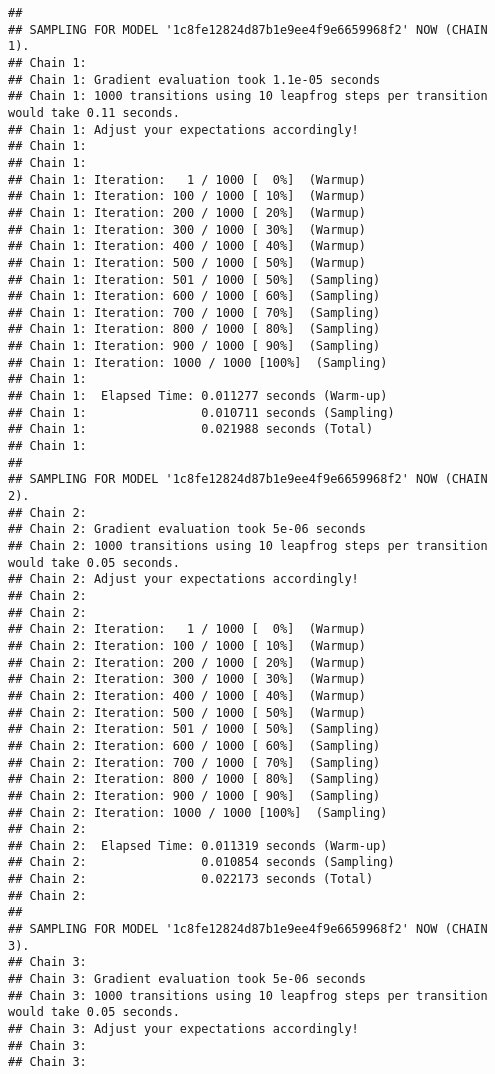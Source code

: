 \documentclass[]{article}
\begin{document}
\begin{verbatim}
## 
## SAMPLING FOR MODEL '1c8fe12824d87b1e9ee4f9e6659968f2' NOW (CHAIN 1).
## Chain 1: 
## Chain 1: Gradient evaluation took 1.1e-05 seconds
## Chain 1: 1000 transitions using 10 leapfrog steps per transition would take 0.11 seconds.
## Chain 1: Adjust your expectations accordingly!
## Chain 1: 
## Chain 1: 
## Chain 1: Iteration:   1 / 1000 [  0%]  (Warmup)
## Chain 1: Iteration: 100 / 1000 [ 10%]  (Warmup)
## Chain 1: Iteration: 200 / 1000 [ 20%]  (Warmup)
## Chain 1: Iteration: 300 / 1000 [ 30%]  (Warmup)
## Chain 1: Iteration: 400 / 1000 [ 40%]  (Warmup)
## Chain 1: Iteration: 500 / 1000 [ 50%]  (Warmup)
## Chain 1: Iteration: 501 / 1000 [ 50%]  (Sampling)
## Chain 1: Iteration: 600 / 1000 [ 60%]  (Sampling)
## Chain 1: Iteration: 700 / 1000 [ 70%]  (Sampling)
## Chain 1: Iteration: 800 / 1000 [ 80%]  (Sampling)
## Chain 1: Iteration: 900 / 1000 [ 90%]  (Sampling)
## Chain 1: Iteration: 1000 / 1000 [100%]  (Sampling)
## Chain 1: 
## Chain 1:  Elapsed Time: 0.011277 seconds (Warm-up)
## Chain 1:                0.010711 seconds (Sampling)
## Chain 1:                0.021988 seconds (Total)
## Chain 1: 
## 
## SAMPLING FOR MODEL '1c8fe12824d87b1e9ee4f9e6659968f2' NOW (CHAIN 2).
## Chain 2: 
## Chain 2: Gradient evaluation took 5e-06 seconds
## Chain 2: 1000 transitions using 10 leapfrog steps per transition would take 0.05 seconds.
## Chain 2: Adjust your expectations accordingly!
## Chain 2: 
## Chain 2: 
## Chain 2: Iteration:   1 / 1000 [  0%]  (Warmup)
## Chain 2: Iteration: 100 / 1000 [ 10%]  (Warmup)
## Chain 2: Iteration: 200 / 1000 [ 20%]  (Warmup)
## Chain 2: Iteration: 300 / 1000 [ 30%]  (Warmup)
## Chain 2: Iteration: 400 / 1000 [ 40%]  (Warmup)
## Chain 2: Iteration: 500 / 1000 [ 50%]  (Warmup)
## Chain 2: Iteration: 501 / 1000 [ 50%]  (Sampling)
## Chain 2: Iteration: 600 / 1000 [ 60%]  (Sampling)
## Chain 2: Iteration: 700 / 1000 [ 70%]  (Sampling)
## Chain 2: Iteration: 800 / 1000 [ 80%]  (Sampling)
## Chain 2: Iteration: 900 / 1000 [ 90%]  (Sampling)
## Chain 2: Iteration: 1000 / 1000 [100%]  (Sampling)
## Chain 2: 
## Chain 2:  Elapsed Time: 0.011319 seconds (Warm-up)
## Chain 2:                0.010854 seconds (Sampling)
## Chain 2:                0.022173 seconds (Total)
## Chain 2: 
## 
## SAMPLING FOR MODEL '1c8fe12824d87b1e9ee4f9e6659968f2' NOW (CHAIN 3).
## Chain 3: 
## Chain 3: Gradient evaluation took 5e-06 seconds
## Chain 3: 1000 transitions using 10 leapfrog steps per transition would take 0.05 seconds.
## Chain 3: Adjust your expectations accordingly!
## Chain 3: 
## Chain 3: 

\end{verbatim}
\end{document}
